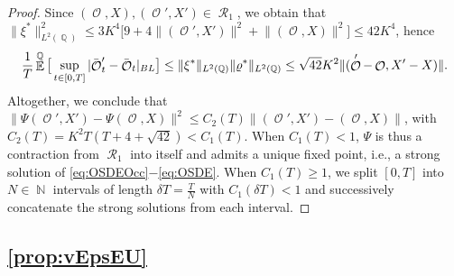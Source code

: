 \documentclass[11pt]{article}
\theoremstyle{plain}
\theoremstyle{definition}
\DeclareMathOperator{\E}{\mathbb{E}}
\DeclareMathOperator{\N}{\mathbb{N}}
\DeclareMathOperator{\Q}{\mathbb{Q}}
\DeclareMathOperator{\calO}{\mathcal{O}}
\DeclareMathOperator{\calR}{\mathcal{R}}
\begin{document}
\begin{proof}
Since $(\calO,X),(\calO',X')\in \calR_1$, we obtain that $\lVert \xi^*  \rVert_{L^2(\Q)}^2 \le 3K^4 \big[9+4\lVert (\calO',X')\rVert^2 + \lVert (\calO,X)\rVert^2  \big] \le 42K^4$, hence      
\begin{align*}
  \frac{1}{T} \E^{\Q} \big[ \sup_{t\in [0,T]}| \bar{\calO}_t'-\bar{\calO}_t |_{\textnormal{\tiny{BL}}}\big] \le  %
  \lVert \xi^*  \rVert_{L^2(\Q)}\lVert  \varrho^* \rVert_{L^2(\Q)} \le \sqrt{42}K^2 \lVert (\calO'-\calO,X'-X)\rVert.
\end{align*}
Altogether, we conclude that 
$\lVert \Psi(\calO',X') -  \Psi(\calO,X)\rVert^2 \le C_2(T)\lVert (\calO',X')-(\calO,X)\rVert$, with $  C_2(T) =  K^2T(T+4+\sqrt{42}) < C_1(T).$ 
When $C_1(T) < 1$, $\Psi$ is thus a contraction from $\calR_1$ into itself and  admits a unique fixed point, i.e.,  a strong solution of \eqref{eq:OSDEOcc}$-$\eqref{eq:OSDE}. When $C_1(T) \ge 1$, we split $[0,T]$ into $N\in \N$ intervals of length $\delta T = \frac{T}{N}$ with  $C_1(\delta T) < 1$ and   successively concatenate  the  strong solutions from   each interval. 
\end{proof}

\subsection{\cref{prop:vEpsEU}}\label{app:vEpsEU}
\end{document}
